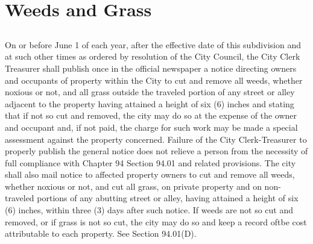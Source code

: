 \section{Weeds and Grass}
\subsection{}
On or before June 1 of each year, after the effective date of this subdivision and at such other times as ordered by resolution of the City Council, the City Clerk Treasurer shall publish once in the official newspaper a notice directing owners and occupants of property within the City to cut and remove all weeds, whether noxious or not, and all grass outside the traveled portion of any street or alley adjacent to the property having attained a height of six (6) inches and stating that if not so cut and removed, the city may do so at the expense of the owner and occupant and, if not paid, the charge for such work may be made a special assessment against the property concerned. Failure of the City Clerk-Treasurer to properly publish the general notice does not relieve a person from the necessity of full compliance with Chapter 94 Section 94.01 and related provisions. The city shall also mail notice to affected property owners to cut and remove all weeds, whether noxious or not, and cut all grass, on private property and on non-traveled portions of any abutting street or alley, having attained a height of six (6) inches, within three (3) days after such notice. If weeds are not so cut and removed, or if grass is not so cut, the city may do so and keep a record oftbe cost attributable to each property. See Section 94.01(D).

